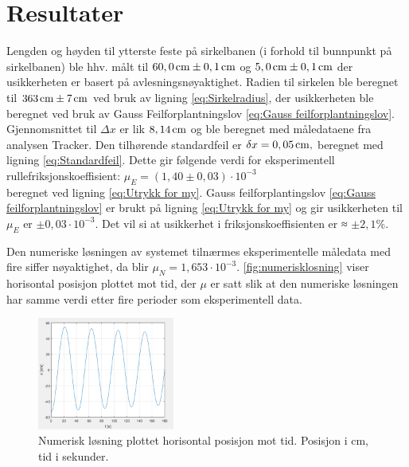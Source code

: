 \section{Resultater}
Lengden og høyden til ytterste feste på sirkelbanen (i forhold til bunnpunkt på sirkelbanen) ble hhv. målt til $60,0 \hspace{0,5mm}\mathrm{cm} \pm 0,1 \hspace{0,5mm}\mathrm{cm}$ og $5,0 \hspace{0,5mm}\mathrm{cm} \pm 0,1 \hspace{0,5mm}\mathrm{cm}$ der usikkerheten er basert på avlesningsnøyaktighet.
Radien til sirkelen ble beregnet til $363\hspace{0,5mm}\mathrm{cm} \pm 7\hspace{0,5mm}\mathrm{cm}$ ved bruk av ligning \eqref{eq:Sirkelradius}, der usikkerheten ble beregnet ved bruk av Gauss Feilforplantningslov \eqref{eq:Gauss feilforplantningslov}. Gjennomsnittet til $\Delta x$ er lik $8,14 \hspace{0,5mm}\mathrm{cm}$ og ble beregnet med måledataene fra analysen Tracker. 
Den tilhørende standardfeil er $\delta x = 0,05 \hspace{0,5mm}\mathrm{cm},$ beregnet med ligning \eqref{eq:Standardfeil}.
Dette gir følgende verdi for eksperimentell rullefriksjonskoeffisient: $\mu_{E} = (1,40\pm 0,03) \cdot 10^{-3}$\\ beregnet ved ligning \eqref{eq:Utrykk for my}. Gauss feilforplantingslov \eqref{eq:Gauss feilforplantningslov} er brukt på ligning \eqref{eq:Utrykk for my} og gir usikkerheten til $\mu_E$ er $\pm0,03\cdot 10^{-3}$. Det vil si at usikkerhet i friksjonskoeffisienten er ≈ $\pm 2,1\%$.

Den numeriske løsningen av systemet tilnærmes eksperimentelle måledata  med fire siffer nøyaktighet, da blir $\mu_N = 1,653 \cdot 10^{-3}$. \autoref{fig:numerisklosning} viser horisontal posisjon plottet mot tid, der $\mu$ er satt slik at den numeriske løsningen har samme verdi etter fire perioder som eksperimentell data. 

\FloatBarrier
\begin{figure}[h!] 
\centering
\includegraphics[width=0.4\textwidth]{Rapport/losningnumerik.png}

\caption{Numerisk løsning plottet horisontal posisjon mot tid. Posisjon i cm, tid i sekunder.}
\label{fig:numerisklosning}
\end{figure}
\FloatBarrier


